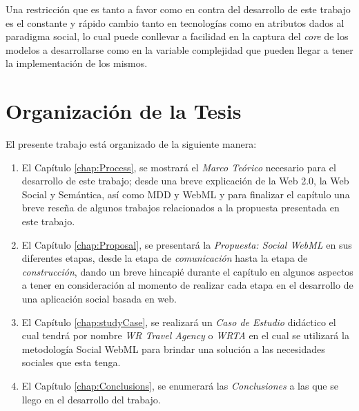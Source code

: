 \documentclass[oneside,12pt,a4paper]{memoir}%
\begin{document}
	Una restricci\'on que es tanto a favor como en contra del desarrollo de este
	trabajo es el constante y r\'apido cambio tanto en tecnolog\'ias como en
	atributos dados al paradigma social, lo cual puede conllevar a facilidad en
	la captura del \textit{core} de los modelos a desarrollarse como en la variable
	complejidad que pueden llegar a tener la implementaci\'on de los mismos.
	
	\section{Organizaci\'on de la Tesis}
	\label{src:Organization}
	El presente trabajo est\'a organizado de la siguiente manera:
	
	\begin{enumerate}
	  \item El Cap\'itulo \ref{chap:Process}, se mostrar\'a el \textit{Marco
	  Te\'orico} necesario para el desarrollo de este trabajo; desde una breve
	  explicaci\'on de la Web 2.0, la Web Social y Sem\'antica, as\'i como \ac{MDD}
	  y \ac{WebML} y para finalizar el cap\'itulo una breve rese\~na de algunos
	  trabajos relacionados a la propuesta presentada en este trabajo.
	  \item El Cap\'itulo \ref{chap:Proposal}, se presentar\'a la
	  \textit{Propuesta: Social WebML} en sus diferentes etapas, desde la etapa de
	  \textit{comunicaci\'on} hasta la etapa de \textit{construcci\'on}, dando un
	  breve hincapi\'e durante el cap\'itulo en algunos aspectos a tener en
	  consideraci\'on al momento de realizar cada etapa en el desarrollo de una
	  aplicaci\'on social basada en web.
	  \item El Cap\'itulo \ref{chap:studyCase}, se realizar\'a un \textit{Caso de
	  Estudio} did\'actico el cual tendr\'a por nombre \textit{WR Travel Agency} o
	  \textit{WRTA} en el cual se utilizar\'a la metodolog\'ia Social WebML para
	  brindar una soluci\'on a las necesidades sociales que esta tenga.
	  \item El Cap\'itulo \ref{chap:Conclusions}, se enumerar\'a las
	  \textit{Conclusiones} a las que se llego en el desarrollo del trabajo.
	\end{enumerate}
\end{document}
